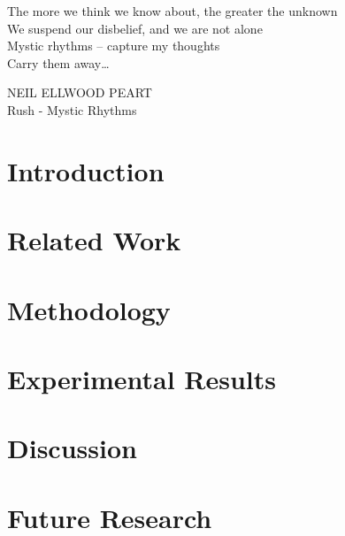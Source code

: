 \documentclass[12pt]{report} %
\theoremstyle{definition}
\begin{document}
\clearpage

\thispagestyle{empty}
\null\vfill

\newlength\longest
\settowidth{}
\begin{center}
    \parbox{\longest}{%
    \raggedright{\large\itshape%

    The more we think we know about, the greater the unknown\\
    We suspend our disbelief, and we are not alone\\
    Mystic rhythms -- capture my thoughts\\
    Carry them away\dots\\
    \par\bigskip
    }   
    \raggedleft\large\MakeUppercase{Neil Ellwood Peart}\\\small Rush - Mystic Rhythms\par%
    }
\end{center}

\vfill\vfill

\clearpage


\tableofcontents

\chapter{Introduction}
\label{ch:intro}


\chapter{Related Work}
\label{ch:r_work}


\chapter{Methodology}
\label{ch:method}


\chapter{Experimental Results}
\label{ch:results}


\chapter{Discussion}
\label{ch:discussion}


\chapter{Future Research}
\label{ch:future_research}


%
%
\printbibliography

\appendix
\appendixpage
\addappheadtotoc

\end{document}
